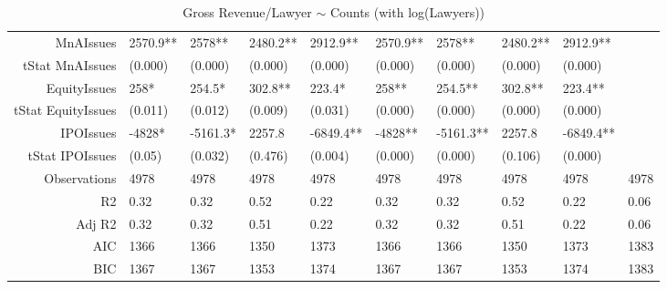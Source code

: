 \begin{table}[ht]
\begin{tabular}{rlllllllll}
  MnAIssues & 2570.9** & 2578** & 2480.2** & 2912.9** & 2570.9** & 2578** & 2480.2** & 2912.9** &  \\ 
  tStat MnAIssues & (0.000) & (0.000) & (0.000) & (0.000) & (0.000) & (0.000) & (0.000) & (0.000) &  \\ 
  EquityIssues & 258* & 254.5* & 302.8** & 223.4* & 258** & 254.5** & 302.8** & 223.4** &  \\ 
  tStat EquityIssues & (0.011) & (0.012) & (0.009) & (0.031) & (0.000) & (0.000) & (0.000) & (0.000) &  \\ 
  IPOIssues & -4828* & -5161.3* & 2257.8 & -6849.4** & -4828** & -5161.3** & 2257.8 & -6849.4** &  \\ 
  tStat IPOIssues & (0.05) & (0.032) & (0.476) & (0.004) & (0.000) & (0.000) & (0.106) & (0.000) &  \\ 
  Observations & 4978 & 4978 & 4978 & 4978 & 4978 & 4978 & 4978 & 4978 & 4978 \\ 
  R2 & 0.32 & 0.32 & 0.52 & 0.22 & 0.32 & 0.32 & 0.52 & 0.22 & 0.06 \\ 
  Adj R2 & 0.32 & 0.32 & 0.51 & 0.22 & 0.32 & 0.32 & 0.51 & 0.22 & 0.06 \\ 
  AIC & 1366 & 1366 & 1350 & 1373 & 1366 & 1366 & 1350 & 1373 & 1383 \\ 
  BIC & 1367 & 1367 & 1353 & 1374 & 1367 & 1367 & 1353 & 1374 & 1383 \\ 
   \hline
\end{tabular}
\caption{Gross Revenue/Lawyer $\sim$ Counts (with log(Lawyers))} 
\end{table}
